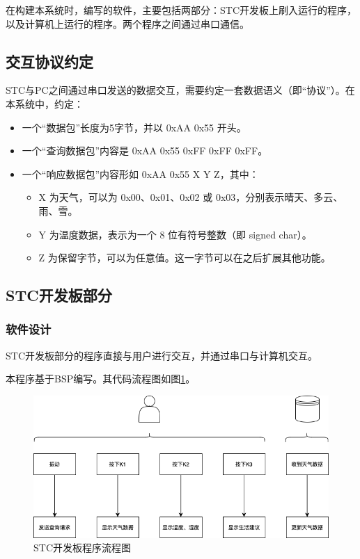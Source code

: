 \documentclass{article}
\begin{document}
在构建本系统时，编写的软件，主要包括两部分：STC开发板上刷入运行的程序，以及计算机上运行的程序。两个程序之间通过串口通信。

\subsection{交互协议约定}

STC与PC之间通过串口发送的数据交互，需要约定一套数据语义（即“协议”）。在本系统中，约定：

\begin{itemize}
  \item 一个“数据包”长度为5字节，并以 0xAA 0x55 开头。
  \item 一个“查询数据包”内容是 0xAA 0x55 0xFF 0xFF 0xFF。
  \item 一个“响应数据包”内容形如 0xAA 0x55 X Y Z，其中：
  \begin{itemize}
    \item X 为天气，可以为 0x00、0x01、0x02 或 0x03，分别表示晴天、多云、雨、雪。
    \item Y 为温度数据，表示为一个 8 位有符号整数（即 signed char）。
    \item Z 为保留字节，可以为任意值。这一字节可以在之后扩展其他功能。
  \end{itemize}
\end{itemize}

\subsection{STC开发板部分}

\subsubsection{软件设计}

STC开发板部分的程序直接与用户进行交互，并通过串口与计算机交互。

本程序基于BSP编写。其代码流程图如图\ref{fig:stc_flow}。

\begin{figure}[h]
    \centering
    \includegraphics[width=1\textwidth]{stc_flow}
    \caption{STC开发板程序流程图}
    \label{fig:stc_flow}
\end{figure}
\end{document}
